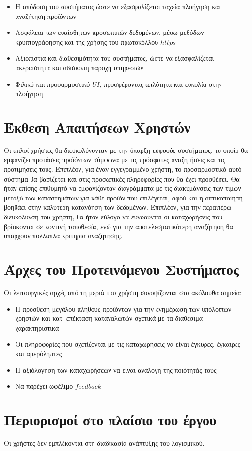 \documentclass[12pt]{article}
\begin{document}
	
\begin{itemize}
	\item Η απόδοση του συστήματος	ώστε να εξασφαλίζεται ταχεία πλοήγηση και αναζήτηση προϊόντων
	\item Ασφάλεια των ευαίσθητων προσωπικών δεδομένων, μέσω μεθόδων κρυπτογράφησης και της χρήσης του πρωτοκόλλου $https$
	\item Αξιοπιστια και διαθεσιμότητα του συστήματος, ώστε να εξασφαλίζεται ακεραιότητα και αδιάκοπη παροχή υπηρεσιών
	\item Φιλικό και προσαρμοστικό $UI$, προσφέροντας απλότητα και ευκολία στην πλοήγηση
	
\end{itemize}	 	


\section{Έκθεση Απαιτήσεων Χρηστών}

Οι απλοί χρήστες θα διευκολύνονταν με την ύπαρξη ευφυούς συστήματος, το οποίο θα εμφανίζει προτάσεις προϊόντων σύμφωνα με τις πρόσφατες αναζητήσεις και τις προτιμήσεις τους.  
Επιπλέον, για έναν εγγεγραμμένο χρήστη, το προσαρμοστικό αυτό σύστημα θα βασίζεται και στις προσωπικές πληροφορίες που θα έχει προσθέσει.
Θα ήταν επίσης επιθυμητό να εμφανίζονταν διαγράμματα με τις διακυμάνσεις των τιμών μεταξύ των καταστημάτων για κάθε προϊόν που επιλέγεται, αφού και η οπτικοποίηση βοηθάει στην καλύτερη κατανόηση των δεδομένων. Επιπλέον, για την περαιτέρω διευκόλυνση του χρήστη, θα ήταν εύλογο να ευνοούνται οι καταχωρήσεις που βρίσκονται σε κοντινή τοποθεσία, ενώ για την αποτελεσματικότερη αναζήτηση θα υπάρχουν πολλαπλά κριτήρια αναζήτησης.

\section{Άρχες του Προτεινόμενου Συστήματος}

Οι λειτουργικές αρχές από τη μεριά του χρήστη συνοψίζονται στα ακόλουθα σημεία:
\begin{itemize}
	\item Η πρόσθεση μεγάλου πλήθους προϊόντων για την ενημέρωση των υπόλοιπων χρηστών και κατ' επέκταση καταναλωτών σχετικά με τα διαθέσιμα χαρακτηριστικά
	\item Οι πληροφορίες που σχετίζονται με τις καταχωρήσεις να είναι έγκυρες, έγκαιρες και αμερόληπτες
	\item Η αξιόλογηση των καταχωρήσεων να είναι ανάλογη της ποιότητάς τους
	\item Να παρέχει ωφέλιμο $feedback$
\end{itemize}

\section{Περιορισμοί στο πλαίσιο του έργου}

Οι χρήστες δεν εμπλέκονται στη διαδικασία ανάπτυξης του λογισμικού.
\end{document}
